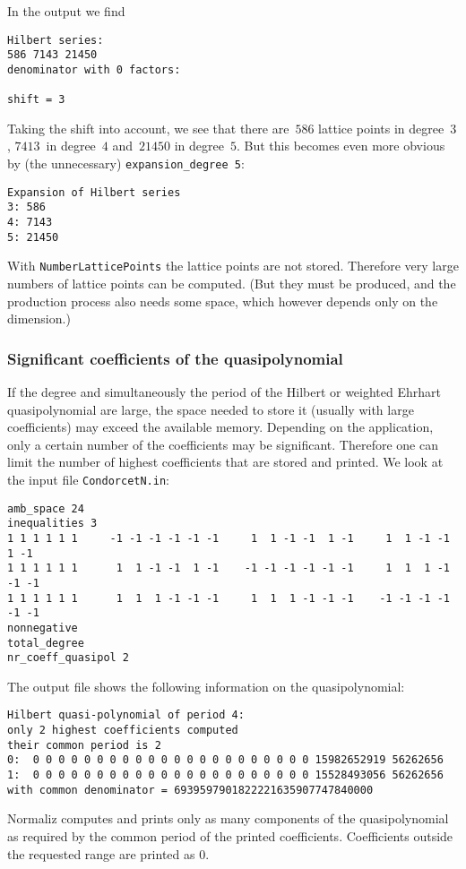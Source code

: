 \documentclass[12pt,a4paper]{scrartcl}
\theoremstyle{definition}
\begin{document}
In the output we find
\begin{Verbatim}
Hilbert series:
586 7143 21450 
denominator with 0 factors:

shift = 3
\end{Verbatim}

Taking the shift into account, we see that there are~$586$ lattice points in degree~$3$, $7413$~in degree~$4$ and~$21450$ in degree~$5$. But this becomes even more obvious by (the unnecessary) \verb|expansion_degree 5|:
\begin{Verbatim}
Expansion of Hilbert series
3: 586
4: 7143
5: 21450
\end{Verbatim}
With \verb|NumberLatticePoints| the lattice points are not stored. Therefore very large numbers of lattice points can be computed. (But they must be produced, and the production process also needs some space, which however depends only on the dimension.)

\subsubsection{Significant coefficients of the quasipolynomial}\label{highest_coeff}

If the degree and simultaneously the period of the Hilbert or weighted Ehrhart quasipolynomial are large, the space needed to store it (usually with large coefficients) may exceed the available memory. Depending on the application, only a certain number of the coefficients may be significant. Therefore one can limit the number of highest coefficients that are stored and printed. We look at the input file \texttt{CondorcetN.in}:
\begin{Verbatim}
amb_space 24
inequalities 3
1 1 1 1 1 1     -1 -1 -1 -1 -1 -1     1  1 -1 -1  1 -1     1  1 -1 -1  1 -1
1 1 1 1 1 1      1  1 -1 -1  1 -1    -1 -1 -1 -1 -1 -1     1  1  1 -1 -1 -1
1 1 1 1 1 1      1  1  1 -1 -1 -1     1  1  1 -1 -1 -1    -1 -1 -1 -1 -1 -1
nonnegative
total_degree
nr_coeff_quasipol 2
\end{Verbatim}

The output file shows the following information on the quasipolynomial:
\begin{Verbatim}
Hilbert quasi-polynomial of period 4:
only 2 highest coefficients computed
their common period is 2
0:  0 0 0 0 0 0 0 0 0 0 0 0 0 0 0 0 0 0 0 0 0 0 15982652919 56262656
1:  0 0 0 0 0 0 0 0 0 0 0 0 0 0 0 0 0 0 0 0 0 0 15528493056 56262656
with common denominator = 6939597901822221635907747840000
\end{Verbatim}
Normaliz computes and prints only as many components of the quasipolynomial as required by the common period of the printed coefficients. Coefficients outside the requested range are printed as $0$.
\end{document}
